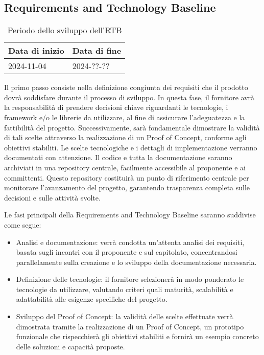 \subsection{Requirements and Technology Baseline}
\begin{table}[h!]
    \centering
    \renewcommand{\arraystretch}{1.5} %
    \begin{tabularx}{\textwidth}{|X|X|}\hline
    \rowcolor[HTML]{FFD700} 
    \textbf{Data di inizio} & \textbf{Data di fine} \\ \hline
    2024-11-04 & 2024-??-?? \\ \hline
    \end{tabularx}
    \caption{Periodo dello sviluppo dell’RTB}
\end{table}
Il primo passo consiste nella definizione congiunta dei requisiti che il prodotto dovrà soddisfare durante il processo di sviluppo. In questa fase, il fornitore avrà la responsabilità di prendere decisioni chiave riguardanti le tecnologie, i framework e/o le librerie da utilizzare, al fine di assicurare l'adeguatezza e la fattibilità del progetto.
Successivamente, sarà fondamentale dimostrare la validità di tali scelte attraverso la realizzazione di un Proof of Concept, conforme agli obiettivi stabiliti.
Le scelte tecnologiche e i dettagli di implementazione verranno documentati con attenzione.
Il codice e tutta la documentazione saranno archiviati in una repository centrale, facilmente accessibile al proponente e ai committenti. 
Questo repository costituirà un punto di riferimento centrale per monitorare l'avanzamento del progetto, garantendo trasparenza completa sulle decisioni e sulle attività svolte.

Le fasi principali della Requirements and Technology Baseline saranno suddivise come
segue:
\begin{itemize}
\item Analisi e documentazione: verrà condotta un’attenta analisi dei requisiti, basata sugli incontri con il proponente e sul capitolato, concentrandosi parallelamente sulla creazione e lo sviluppo della documentazione necessaria.
\item Definizione delle tecnologie: il fornitore selezionerà in modo ponderato le tecnologie da utilizzare, valutando criteri quali maturità, scalabilità e adattabilità alle esigenze specifiche del progetto.
\item Sviluppo del Proof of Concept: la validità delle scelte effettuate verrà dimostrata tramite la realizzazione di un Proof of Concept, un prototipo funzionale che rispecchierà gli obiettivi stabiliti e fornirà un esempio concreto delle soluzioni e capacità proposte.
\end{itemize}

